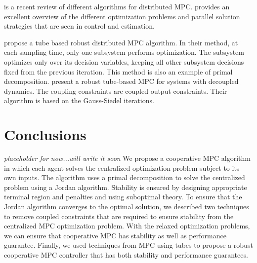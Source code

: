 \documentclass[10pt]{article}
\theoremstyle{definition}
\begin{document}
\citet{christofides:scattolini:pena:liu:2012} is a recent review of different algorithms for distributed
MPC. \citet{necoara:nedelcu:dumitrache:2011} provides an excellent overview of the different
optimization problems and parallel solution strategies that are seen
in control and estimation.

\citet{trodden:richards:2006,trodden:richards:2007} propose a tube based robust distributed
MPC algorithm. In their method, at each sampling time, only one
subsystem performs optimization. The subsystem optimizes only over its
decision variables, keeping all other subsystem decisions fixed from
the previous iteration. This method is also an example of primal
decomposition. \citet{richards:how:2004} present a robust tube-based
MPC for systems with decoupled dynamics. The coupling constraints are
coupled output constraints. Their algorithm is based on the
Gauss-Siedel iterations.



\section{Conclusions}
\label{sec:conclusions}

{\em{placeholder for now...will write it soon}}
We propose a cooperative MPC algorithm in which each agent solves the
centralized optimization problem subject to its own inputs. The
algorithm uses a primal decomposition to solve the centralized problem
using a Jordan algorithm. Stability is ensured by designing
appropriate terminal region and penalties and using suboptimal theory.
To ensure that the Jordan algorithm converges to the optimal solution, we described two techniques to
remove coupled constraints that are required to ensure stability from the centralized MPC optimization
problem. With the relaxed optimization problems, we can ensure that
cooperative MPC has stability as well as performance
guarantee. Finally, we used techniques from MPC using tubes to propose
a robust cooperative MPC controller that has both stability and
performance guarantees.



{
}
\end{document}
